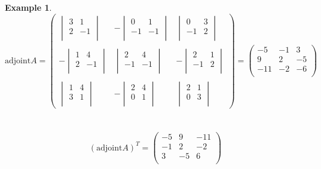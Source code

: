 \documentclass[11pt,a4paper]{article}
\theoremstyle{definition}
\newtheorem{example}[thm]{Example}
\begin{document}
\begin{example}
$$\text{adjoint} A=
\begin{pmatrix}
\begin{vmatrix}
3 & 1\\
2 & -1\\
\end{vmatrix}
& -
\begin{vmatrix}
0 & 1\\
-1 & -1\\
\end{vmatrix}
& 
\begin{vmatrix}
0 & 3\\
-1 & 2\\
\end{vmatrix}\\\\
-
\begin{vmatrix}
1 & 4\\
2 & -1\\
\end{vmatrix}
&
\begin{vmatrix}
2 & 4\\
-1 & -1\\
\end{vmatrix}
& -
\begin{vmatrix}
2 & 1\\
-1 & 2\\
\end{vmatrix}\\\\
\begin{vmatrix}
1 & 4\\
3 & 1\\
\end{vmatrix}
& -
\begin{vmatrix}
2 & 4\\
0 & 1\\
\end{vmatrix}
&
\begin{vmatrix}
2 & 1\\
0 & 3\\
\end{vmatrix}
\end{pmatrix}
=
\begin{pmatrix}
-5 & -1 & 3\\
9 & 2 & -5\\
-11 & -2 & -6\\
\end{pmatrix}
$$\\\\


$$(\text{adjoint} A)^T=
\begin{pmatrix}
-5 & 9 & -11\\
-1 & 2 & -2\\
3 & -5 & 6\\
\end{pmatrix}
$$\\\\


\end{example}
\end{document}
